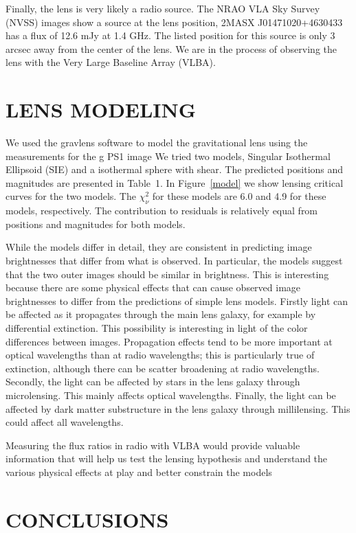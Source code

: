 \documentclass[manuscript]{aastex}
\begin{document}
Finally, the lens is very likely a radio source. The NRAO VLA Sky Survey (NVSS) images show a source at the lens position, 2MASX J01471020+4630433 has a flux of 12.6 mJy at 1.4 GHz. The listed position for this source is  only 3 arcsec away from the center of the lens. We are in the process of observing the lens with the Very Large Baseline Array (VLBA).


\section{LENS MODELING}


We used the gravlens software to model the gravitational lens \citep{kee01} using the measurements for the g PS1 image
We tried two  models, Singular Isothermal Ellipsoid (SIE) and a isothermal sphere with shear.
The predicted positions and magnitudes are presented in Table~1. In Figure~\ref{model} we show 
lensing critical curves for the two models. The $\chi^2_{\nu}$ for these models are 6.0 and 4.9 for these models, respectively. The contribution to residuals is relatively equal from positions and magnitudes for both models.


While the models differ in detail, they are consistent in predicting image brightnesses that differ from what is observed.  In particular, the models suggest that the two outer images should be similar in brightness.  This is interesting because there are some physical effects that can cause observed image brightnesses to differ from the predictions of simple lens models. Firstly light can be affected as it propagates through the main lens galaxy, for example by differential extinction.  This possibility is interesting in light of the color differences between images.  Propagation effects tend to be more important at optical wavelengths than at radio wavelengths; this is particularly true of extinction, although there can be scatter broadening at radio wavelengths. Secondly, the light can be affected by stars in the lens galaxy through microlensing.  This mainly affects optical wavelengths.
Finally, the light can be affected by dark matter substructure in the lens galaxy through millilensing.  This could affect all wavelengths.

Measuring the flux ratios in radio with VLBA would provide valuable information that will help us test the lensing hypothesis and understand the various physical effects at play and better constrain the models 


\section{CONCLUSIONS}
\end{document}

